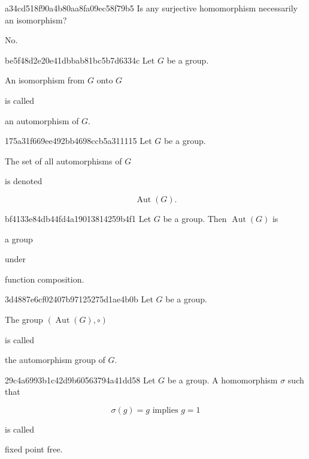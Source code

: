 \begin{note}{a34cd518f90a4b80aa8fa09ec58f79b5}
    Is any surjective homomorphism necessarily an isomorphism?

    \begin{cloze}{1}
        No.
    \end{cloze}
\end{note}

\begin{note}{be5f48d2e20e41dbbab81bc5b7d6334c}
    Let \({ G }\) be a group.
    \begin{icloze}{2}An isomorphism from \({ G }\) onto \({ G }\)\end{icloze} is called \begin{icloze}{1}an automorphism of \({ G }\).\end{icloze}
\end{note}

\begin{note}{175a31f669ee492bb4698ccb5a311115}
    Let \({ G }\) be a group.
    \begin{icloze}{2}The set of all automorphisms of \({ G }\)\end{icloze} is denoted
    \begin{icloze}{1}
        \[
            \operatorname{Aut}(G).
        \]
    \end{icloze}
\end{note}

\begin{note}{bf4133e84db44fd4a19013814259b4f1}
    Let \({ G }\) be a group.
    Then \({ \operatorname{Aut}(G) }\) is \begin{icloze}{2}a group\end{icloze} under \begin{icloze}{1}function composition.\end{icloze}
\end{note}

\begin{note}{3d4887e6cf02407b97125275d1ae4b0b}
    Let \({ G }\) be a group.
    \begin{icloze}{2}The group \({ (\operatorname{Aut}(G), \circ) }\)\end{icloze} is called \begin{icloze}{1}the automorphism group of \({ G }\).\end{icloze}
\end{note}

\begin{note}{29c4a6993b1c42d9b60563794a41dd58}
    Let \({ G }\) be a group.
    A homomorphism \({ \sigma }\) such that
    \begin{icloze}{1}
        \[
            \sigma(g) = g \text{ implies } g = 1
        \]
    \end{icloze}
    is called \begin{icloze}{2}fixed point free.\end{icloze}
\end{note}

